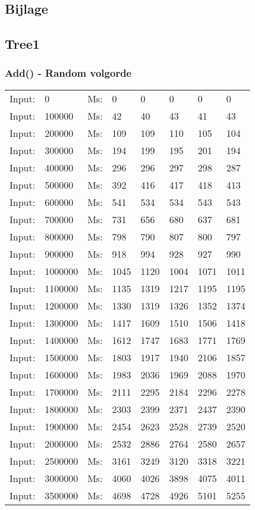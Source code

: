 \documentclass[11pt,a4paper]{report}
\begin{document}
\begin{tiny}
\section*{Bijlage}
\subsection*{Tree1}
\subsubsection*{Add() - Random volgorde}
\begin{tabular}{l l ||l  l  l  l  l  l}
Input:&0&Ms:&0&0&0&0&0\\
Input:&100000&Ms:&42&40&43&41&43\\
Input:&200000&Ms:&109&109&110&105&104\\
Input:&300000&Ms:&194&199&195&201&194\\
Input:&400000&Ms:&296&296&297&298&287\\
Input:&500000&Ms:&392&416&417&418&413\\
Input:&600000&Ms:&541&534&534&543&543\\
Input:&700000&Ms:&731&656&680&637&681\\
Input:&800000&Ms:&798&790&807&800&797\\
Input:&900000&Ms:&918&994&928&927&990\\
Input:&1000000&Ms:&1045&1120&1004&1071&1011\\
Input:&1100000&Ms:&1135&1319&1217&1195&1195\\
Input:&1200000&Ms:&1330&1319&1326&1352&1374\\
Input:&1300000&Ms:&1417&1609&1510&1506&1418\\
Input:&1400000&Ms:&1612&1747&1683&1771&1769\\
Input:&1500000&Ms:&1803&1917&1940&2106&1857\\
Input:&1600000&Ms:&1983&2036&1969&2088&1970\\
Input:&1700000&Ms:&2111&2295&2184&2296&2278\\
Input:&1800000&Ms:&2303&2399&2371&2437&2390\\
Input:&1900000&Ms:&2454&2623&2528&2739&2520\\
Input:&2000000&Ms:&2532&2886&2764&2580&2657\\
Input:&2500000&Ms:&3161&3249&3120&3318&3221\\
Input:&3000000&Ms:&4060&4026&3898&4075&4011\\
Input:&3500000&Ms:&4698&4728&4926&5101&5255\\

\end{tabular}
\end{tiny}
\end{document}
